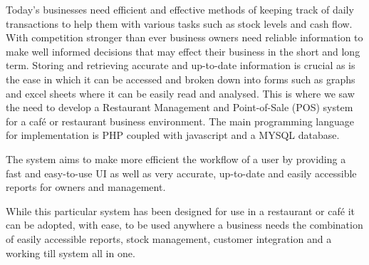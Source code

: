 Today's businesses need efficient and effective methods of keeping track of daily transactions to help them with various tasks such as stock levels and cash flow. With competition stronger than ever business owners need reliable information to make well informed decisions that may effect their business in the short and long term. Storing and retrieving accurate and up-to-date information is crucial as is the ease in which it can be accessed and broken down into forms such as graphs and excel sheets where it can be easily read and analysed. This is where we saw the need to develop a Restaurant Management and Point-of-Sale (POS) system for a café or restaurant business environment. The main programming language for implementation is PHP coupled with javascript and a MYSQL database.\par
The system aims to make more efficient the workflow of a user by providing a fast and easy-to-use UI as well as very accurate, up-to-date and easily accessible reports for owners and management.\par
While this particular system has been designed for use in a restaurant or café it can be adopted, with ease, to be used anywhere a business needs the combination of easily accessible reports, stock management, customer integration and a working till system all in one. 





